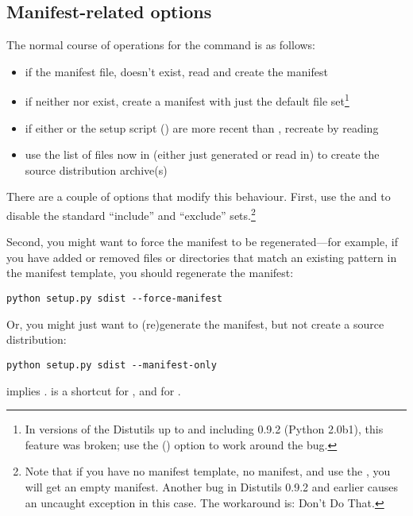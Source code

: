 \documentclass{howto}
\begin{document}
\subsection{Manifest-related options}
\label{manifest-options}

The normal course of operations for the  command is as
follows:
\begin{itemize}
\item if the manifest file,  doesn't exist, read
   and create the manifest
\item if neither  nor  exist, create a
  manifest with just the default file set\footnote{In versions of the
    Distutils up to and including 0.9.2 (Python 2.0b1), this feature was
    broken; use the  ()
    option to work around the bug.}
\item if either  or the setup script ()
  are more recent than , recreate  by
  reading 
\item use the list of files now in  (either just
  generated or read in) to create the source distribution archive(s)
\end{itemize}
There are a couple of options that modify this behaviour.  First, use
the  and  to
disable the standard ``include'' and ``exclude'' sets.\footnote{Note
  that if you have no manifest template, no manifest, and use the
  , you will get an empty manifest.  Another
  bug in Distutils 0.9.2 and earlier causes an uncaught exception in
  this case.  The workaround is: Don't Do That.}

Second, you might want to force the manifest to be regenerated---for
example, if you have added or removed files or directories that match an
existing pattern in the manifest template, you should regenerate the
manifest:
\begin{verbatim}
python setup.py sdist --force-manifest
\end{verbatim}

Or, you might just want to (re)generate the manifest, but not create a
source distribution:
\begin{verbatim}
python setup.py sdist --manifest-only
\end{verbatim}
 implies .
 is a shortcut for , and
 for .
\end{document}

